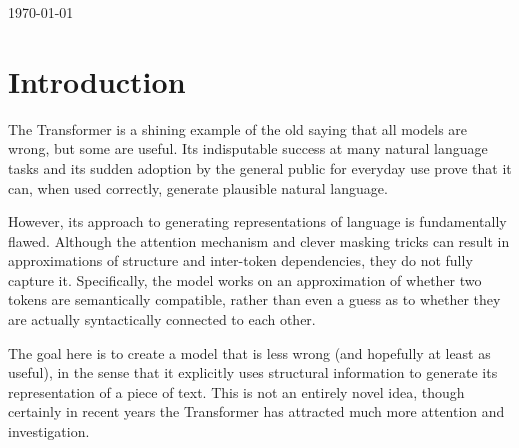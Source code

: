 \documentclass[a4paper, 12pt]{article}
\begin{document}
\begin{titlepage}

{\large \today}\\[1cm] %


 

\vfill %

\end{titlepage}

\tableofcontents
\newpage


\section{Introduction}
The Transformer is a shining example of the old saying that all models are wrong, but some are useful. Its indisputable success at many natural language tasks and its sudden adoption by the general public for everyday use prove that it can, when used correctly, generate plausible natural language.

However, its approach to generating representations of language is fundamentally flawed. Although the attention mechanism and clever masking tricks can result in approximations of structure and inter-token dependencies, they do not fully capture it. Specifically, the model works on an approximation of whether two tokens are semantically compatible, rather than even a guess as to whether they are actually syntactically connected to each other.

The goal here is to create a model that is less wrong (and hopefully at least as useful), in the sense that it explicitly uses structural information to generate its representation of a piece of text. This is not an entirely novel idea, though certainly in recent years the Transformer has attracted much more attention and investigation.
\end{document}
